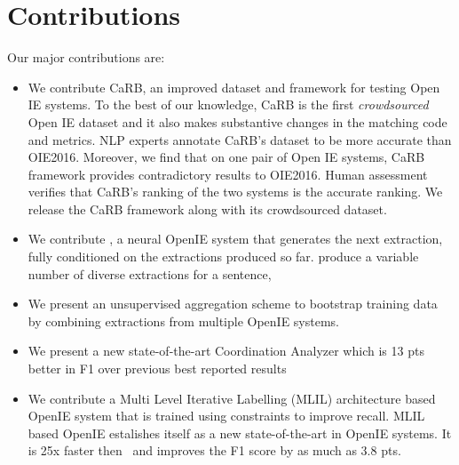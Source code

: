 \section{Contributions}

  Our major contributions are:
  \begin{itemize}
    \item We contribute CaRB, an improved dataset and framework for testing Open IE systems. To the best of our knowledge, CaRB is the first \emph{crowdsourced} Open IE dataset and it also makes substantive changes in the matching code and metrics. NLP experts annotate CaRB's dataset to be more accurate than OIE2016. Moreover, we find that on one  pair of Open IE systems, CaRB framework provides contradictory results to OIE2016. Human assessment verifies that CaRB's ranking of the two systems is the accurate ranking. We release the CaRB framework along with its crowdsourced dataset.

    \item We contribute \shortname{}, a neural OpenIE system that generates the next extraction, fully conditioned on the extractions produced so far. \shortname{} produce a variable number of diverse extractions for a sentence,
    \item We present an unsupervised aggregation scheme to bootstrap training data by combining extractions from multiple OpenIE systems.
    
    \item We present a new state-of-the-art Coordination Analyzer which is 13 pts better in F1 over previous best reported results
    \item We contribute a Multi Level Iterative Labelling (MLIL) architecture based OpenIE system that is trained using constraints to improve recall. MLIL based OpenIE estalishes itself as a new state-of-the-art in OpenIE systems. It is 25x faster then \shortname\ and improves the F1 score by as much as 3.8 pts.
  \end{itemize}

